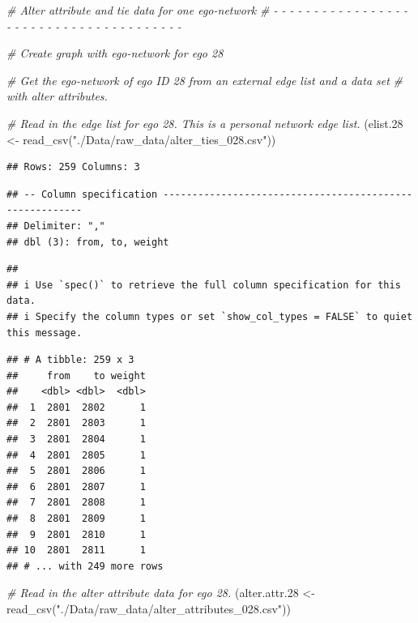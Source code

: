 \documentclass[
]{book}
\newenvironment{Shaded}{\begin{snugshade}}{\end{snugshade}}
\newcommand{\CommentTok}[1]{\textcolor[rgb]{0.56,0.35,0.01}{\textit{#1}}}
\newcommand{\FloatTok}[1]{\textcolor[rgb]{0.00,0.00,0.81}{#1}}
\newcommand{\FunctionTok}[1]{\textcolor[rgb]{0.00,0.00,0.00}{#1}}
\newcommand{\NormalTok}[1]{#1}
\newcommand{\OtherTok}[1]{\textcolor[rgb]{0.56,0.35,0.01}{#1}}
\newcommand{\StringTok}[1]{\textcolor[rgb]{0.31,0.60,0.02}{#1}}
\begin{document}
\begin{Shaded}
\begin{Highlighting}[]
\CommentTok{\# Alter attribute and tie data for one ego{-}network}
\CommentTok{\# {-} {-} {-} {-} {-} {-} {-} {-} {-} {-} {-} {-} {-} {-} {-} {-} {-} {-} {-} {-} {-} {-} {-} {-} {-} {-} {-} {-} {-} {-} {-} {-} {-} {-} {-} {-} {-} {-} {-}}

\CommentTok{\# Create graph with ego{-}network for ego 28}

\CommentTok{\# Get the ego{-}network of ego ID 28 from an external edge list and a data set}
\CommentTok{\# with alter attributes.}

\CommentTok{\# Read in the edge list for ego 28. This is a personal network edge list.}
\NormalTok{(elist}\FloatTok{.28} \OtherTok{\textless{}{-}} \FunctionTok{read\_csv}\NormalTok{(}\StringTok{"./Data/raw\_data/alter\_ties\_028.csv"}\NormalTok{))}
\end{Highlighting}
\end{Shaded}

\begin{verbatim}
## Rows: 259 Columns: 3
\end{verbatim}

\begin{verbatim}
## -- Column specification --------------------------------------------------------
## Delimiter: ","
## dbl (3): from, to, weight
\end{verbatim}

\begin{verbatim}
## 
## i Use `spec()` to retrieve the full column specification for this data.
## i Specify the column types or set `show_col_types = FALSE` to quiet this message.
\end{verbatim}

\begin{verbatim}
## # A tibble: 259 x 3
##     from    to weight
##    <dbl> <dbl>  <dbl>
##  1  2801  2802      1
##  2  2801  2803      1
##  3  2801  2804      1
##  4  2801  2805      1
##  5  2801  2806      1
##  6  2801  2807      1
##  7  2801  2808      1
##  8  2801  2809      1
##  9  2801  2810      1
## 10  2801  2811      1
## # ... with 249 more rows
\end{verbatim}

\begin{Shaded}
\begin{Highlighting}[]
\CommentTok{\# Read in the alter attribute data for ego 28. }
\NormalTok{(alter.attr}\FloatTok{.28} \OtherTok{\textless{}{-}} \FunctionTok{read\_csv}\NormalTok{(}\StringTok{"./Data/raw\_data/alter\_attributes\_028.csv"}\NormalTok{))}
\end{Highlighting}
\end{Shaded}
\end{document}
